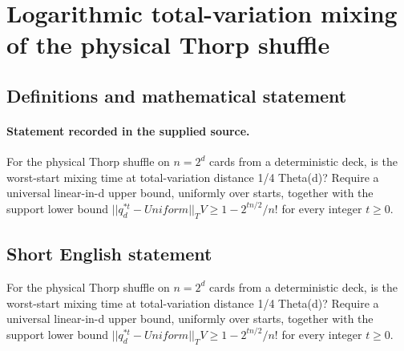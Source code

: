 \documentclass[11pt]{article}
\begin{document}
\section*{Logarithmic total-variation mixing of the physical Thorp shuffle}\label{statement}
\subsection{Definitions and mathematical statement}
\paragraph{Statement recorded in the supplied source.}
For the physical Thorp shuffle on $n=2^d$ cards from a deterministic deck, is the worst-start mixing time at total-variation distance 1/4 Theta(d)? Require a universal linear-in-d upper bound, uniformly over starts, together with the support lower bound $||q_d^{*t}-Uniform||_TV\geq 1-2^{tn/2}/n!$ for every integer $t\geq 0$.
\subsection{Short English statement}
For the physical Thorp shuffle on $n=2^d$ cards from a deterministic deck, is the worst-start mixing time at total-variation distance 1/4 Theta(d)? Require a universal linear-in-d upper bound, uniformly over starts, together with the support lower bound $||q_d^{*t}-Uniform||_TV\geq 1-2^{tn/2}/n!$ for every integer $t\geq 0$.
\end{document}
